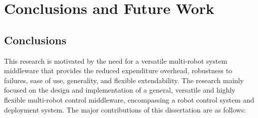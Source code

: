 \chapter{Conclusions and Future Work}

  \section{Conclusions}
    This research is motivated by the need for a versatile multi-robot
      system middleware that provides the reduced expenditure overhead,
      robustness to failures, ease of use, generality, and flexible
      extendability.
    The research mainly focused on the design and implementation of a
      general, versatile and highly flexible multi-robot control
      middleware, encompassing a robot control system and deployment 
      system.
    The major contributions of this dissertation are as follows:
